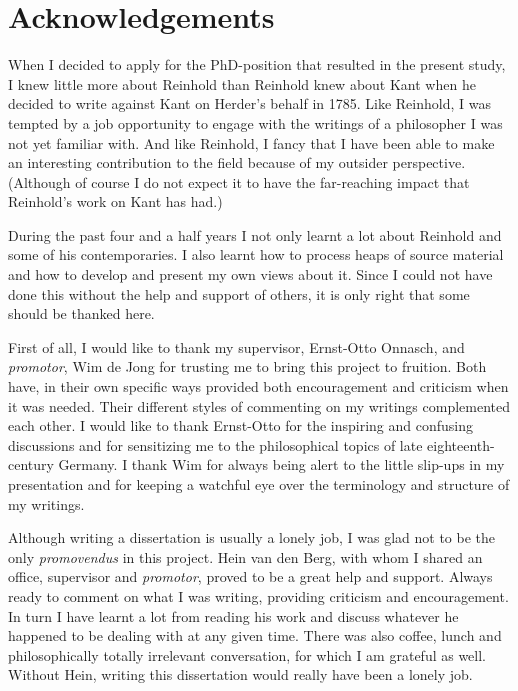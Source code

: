 
\chapter{Acknowledgements}


When I decided to apply for the PhD{-}position that resulted in the present study, I knew little more about Reinhold than Reinhold knew about Kant when he decided to write against Kant on Herder's behalf in 1785. Like Reinhold, I was tempted by a job opportunity to engage with the writings of a philosopher I was not yet familiar with. And like Reinhold, I fancy that I have been able to make an interesting contribution to the field because of my outsider perspective. (Although of course I do not expect it to have the far{-}reaching impact that Reinhold's work on Kant has had.) 

During the past four and a half years I not only learnt a lot about Reinhold and some of his contemporaries. I also learnt how to process heaps of source material and how to develop and present my own views about it. Since I could not have done this without the help and support of others, it is only right that some should be thanked here. 

First of all, I would like to thank my supervisor, Ernst{-}Otto Onnasch, and \textit{promotor}, Wim de Jong for trusting me to bring this project to fruition. Both have, in their own specific ways provided both encouragement and criticism when it was needed. Their different styles of commenting on my writings complemented each other. I would like to thank Ernst{-}Otto for the inspiring and confusing discussions and for sensitizing me to the philosophical topics of late eighteenth{-}century Germany. I thank Wim for always being alert to the little slip{-}ups in my presentation and for keeping a watchful eye over the terminology and structure of my writings. 

Although writing a dissertation is usually a lonely job, I was glad not to be the only \textit{promovendus} in this project. Hein van den Berg, with whom I shared an office, supervisor and \textit{promotor}, proved to be a great help and support. Always ready to comment on what I was writing, providing criticism and encouragement. In turn I have learnt a lot from reading his work and discuss whatever he happened to be dealing with at any given time. There was also coffee, lunch and philosophically totally irrelevant conversation, for which I am grateful as well. Without Hein, writing this dissertation would really have been a lonely job. 

